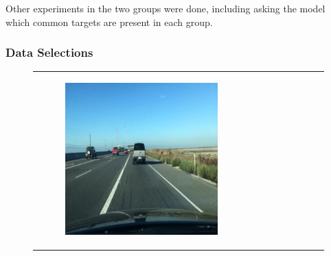 Other experiments in the two groups were done, including asking the model which 
common targets are present in each group.

\subsubsection{Data Selections}
\setlength{\subfigwidth}{45mm}
\setlength{\horspace}{.3\textwidth}
\begin{figure}
    \centering
    \begin{tabular}{p{\horspace} p{\horspace} p{\horspace}}
    \begin{subfigure}[b]{\subfigwidth}
        \includegraphics[width=\subfigwidth]{images/gpt4/s1.jpg}
    \end{subfigure}
    \hfill &
    \begin{subfigure}[b]{\subfigwidth}

\end{subfigure}
\end{tabular}
\end{figure}

